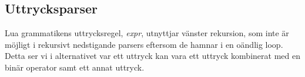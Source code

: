 %

%
%
%
%
%
%
%
%


\subsection{Uttrycksparser}

Lua grammatikens uttrycksregel, \textit{expr}, utnyttjar vänster rekursion,
som inte är möjligt i rekursivt nedstigande parsers eftersom de hamnar i en
oändlig loop. Detta ser vi i alternativet var ett uttryck kan vara ett uttryck
kombinerat med en binär operator samt ett annat uttryck.

